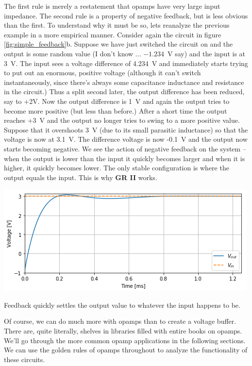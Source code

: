 \documentclass{tufte-book}
\begin{document}
The first rule is merely a restatement that opamps have very large input impedance. The second rule is a property of negative feedback, but is less obvious than the first. To understand why it must be so, lets reanalyze the previous example in a more empirical manner. Consider again the circuit in figure \ref{fig:simple_feedback}b. Suppose we have just switched the circuit on and the output is some random value (I don't know ... $-1.234$~V say) and the input is at 3~V. The input sees a voltage difference of 4.234~V and immediately starts trying to put out an enormous, positive voltage (although it can't switch instantaneously, since there's always some capacitance inductance and resistance in the circuit.) Thus a split second later, the output difference has been reduced, say to +2V. Now the output difference is 1~V and again the output tries to become more positive (but less than before.) After a short time the output reaches +3~V and the output no longer tries to swing to a more positive value. Suppose that it overshoots 3~V (due to its small parasitic inductance) so that the voltage is now at 3.1~V. The difference voltage is now -0.1~V and the output now starts becoming negative. We see the action of negative feedback on the system -- when the output is lower than the input it quickly becomes larger and when it is higher, it quickly becomes lower. The only stable configuration is where the output equals the input. This is why \textbf{GR II} works. 

\begin{marginfigure}%
  \includegraphics[width=\linewidth]{feedback_time_dep}
  \caption{Feedback quickly settles the output value to whatever the input happens to be.}
  \label{fig:feedback_time_dep}
\end{marginfigure}

Of course, we can do much more with opamps than to create a voltage buffer. There are, quite literally, shelves in libraries filled with entire books on opamps. We'll go through the more common opamp applications in the following sections. We can use the golden rules of opamps throughout to analyze the functionality of these circuits.
\end{document}

